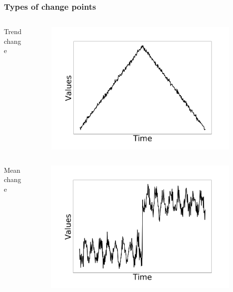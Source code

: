 \documentclass[intlimits, 9pt, unicode]{beamer}
\begin{document}
\begin{frame}
    \frametitle{Types of change points}

\begin{columns}
 \begin{column}{0.5\textwidth}

  \begin{columns}
      \begin{column}{0.3\textwidth}
      \centering
      Trend change
      \end{column}
      \begin{column}{0.5\textwidth}
      \begin{figure}
		\includegraphics[scale=0.08]{images/examples_trend}
	\end{figure}
	\end{column}
     \end{columns}

  \begin{columns}
      \begin{column}{0.3\textwidth}
      \centering
      Mean change
      \end{column}
      \begin{column}{0.5\textwidth}
      \begin{figure}
		\includegraphics[scale=0.08]{images/examples_mean}
	\end{figure}
	\end{column}
     \end{columns}


\end{column}
\end{columns}
\end{frame}
\end{document}
